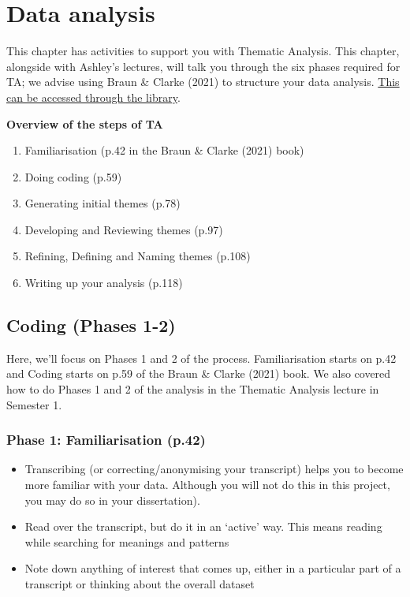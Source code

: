 \documentclass[
  english,
  letterpaper,
  DIV=11,
  numbers=noendperiod]{scrreprt}
\providecommand{\tightlist}{%
  \setlength{\itemsep}{0pt}\setlength{\parskip}{0pt}}
\begin{document}
\chapter{Data analysis}\label{ch8_data_analysis}

This chapter has activities to support you with Thematic Analysis. This
chapter, alongside with Ashley's lectures, will talk you through the six
phases required for TA; we advise using Braun \& Clarke (2021) to
structure your data analysis.
\href{https://go.exlibris.link/Z9qxllzH}{This can be accessed through
the library}.

\textbf{Overview of the steps of TA}

\begin{enumerate}
\def\labelenumi{\arabic{enumi}.}
\tightlist
\item
  Familiarisation (p.42 in the Braun \& Clarke (2021) book)
\item
  Doing coding (p.59)
\item
  Generating initial themes (p.78)
\item
  Developing and Reviewing themes (p.97)
\item
  Refining, Defining and Naming themes (p.108)
\item
  Writing up your analysis (p.118)
\end{enumerate}

\section{Coding (Phases 1-2)}\label{coding-phases-1-2}

Here, we'll focus on Phases 1 and 2 of the process. Familiarisation
starts on p.42 and Coding starts on p.59 of the Braun \& Clarke (2021)
book. We also covered how to do Phases 1 and 2 of the analysis in the
Thematic Analysis lecture in Semester 1.

\subsection{Phase 1: Familiarisation
(p.42)}\label{phase-1-familiarisation-p.42}

\begin{itemize}
\tightlist
\item
  Transcribing (or correcting/anonymising your transcript) helps you to
  become more familiar with your data. Although you will not do this in
  this project, you may do so in your dissertation).
\item
  Read over the transcript, but do it in an `active' way. This means
  reading while searching for meanings and patterns
\item
  Note down anything of interest that comes up, either in a particular
  part of a transcript or thinking about the overall dataset
\end{itemize}
\end{document}
